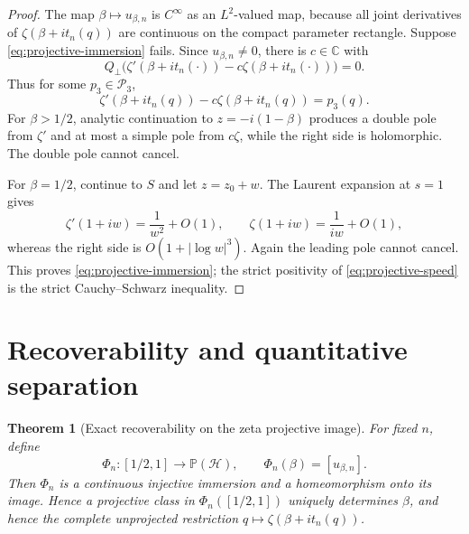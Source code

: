 \documentclass[11pt]{amsart}
\numberwithin{equation}{section}
\newtheorem{theorem}{Theorem}[section]
\newcommand{\C}{\mathbb C}
\newcommand{\Hcal}{\mathcal H}
\newcommand{\Pcal}{\mathcal P}
\newcommand{\PP}{\mathbb P}
\begin{document}
\begin{proof}
The map $\beta\mapsto u_{\beta,n}$ is $C^\infty$ as an $L^2$-valued map,
because all joint derivatives of $\zeta(\beta+i t_n(q))$ are continuous on
the compact parameter rectangle.  Suppose
\eqref{eq:projective-immersion} fails.  Since
$u_{\beta,n}\neq0$, there is $c\in\C$ with
\begin{equation}
 Q_\perp\bigl(\zeta'(\beta+i t_n(\cdot))
 -c\zeta(\beta+i t_n(\cdot))\bigr)=0.
 \label{eq:immersion-kernel}
\end{equation}
Thus for some $p_3\in\Pcal_3$,
\begin{equation}
 \zeta'(\beta+i t_n(q))-c\zeta(\beta+i t_n(q))=p_3(q).
 \label{eq:immersion-polynomial-identity}
\end{equation}
For $\beta>1/2$, analytic continuation to
$z=-i(1-\beta)$ produces a double pole from $\zeta'$ and at most a simple
pole from $c\zeta$, while the right side is holomorphic.  The double pole
cannot cancel.

For $\beta=1/2$, continue to $S$ and let $z=z_0+w$.  The Laurent expansion at
$s=1$ gives
\begin{equation}
 \zeta'(1+iw)=\frac1{w^2}+O(1),
 \qquad
 \zeta(1+iw)=\frac1{iw}+O(1),
 \label{eq:zeta-prime-boundary}
\end{equation}
whereas the right side is
$O(1+|\log w|^3)$.  Again the leading pole cannot cancel.  This proves
\eqref{eq:projective-immersion}; the strict positivity of
\eqref{eq:projective-speed} is the strict Cauchy--Schwarz inequality.
\end{proof}

\section{Recoverability and quantitative separation}
\label{sec:recoverability-quantitative}

\begin{theorem}[Exact recoverability on the zeta projective image]
\label{thm:recoverability}
For fixed $n$, define
\begin{equation}
 \Phi_n:[1/2,1]\longrightarrow\PP(\Hcal),
 \qquad
 \Phi_n(\beta)=[u_{\beta,n}].
 \label{eq:Phi-definition}
\end{equation}
Then $\Phi_n$ is a continuous injective immersion and a homeomorphism onto
its image.  Hence a projective class in $\Phi_n([1/2,1])$ uniquely determines
$\beta$, and hence the complete unprojected restriction
$q\mapsto\zeta(\beta+i t_n(q))$.
\end{theorem}
\end{document}
